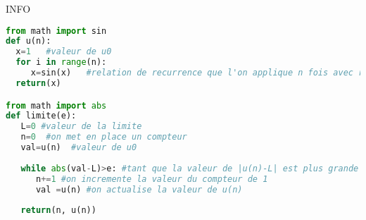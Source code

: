 \documentclass[a4paper, 11pt,reqno]{article}
\begin{document}
\begin{correction}
\begin{enumerate}
\end{enumerate}

INFO


\begin{lstlisting}[language =Python]
from math import sin
def u(n):
  x=1	#valeur de u0
  for i in range(n):
     x=sin(x) 	#relation de recurrence que l'on applique n fois avec range(n)
  return(x)

from math import abs
def limite(e):
   L=0 #valeur de la limite
   n=0  #on met en place un compteur
   val=u(n)  #valeur de u0 
 
   while abs(val-L)>e: #tant que la valeur de |u(n)-L| est plus grande que e
      n+=1 #on incremente la valeur du compteur de 1 
      val =u(n) #on actualise la valeur de u(n)
      
   return(n, u(n))
\end{lstlisting}



\end{correction}
\end{document}
